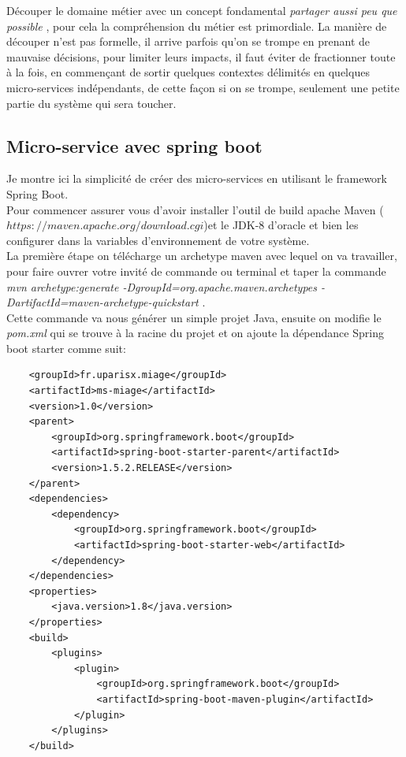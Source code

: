 \documentclass[12pt, a4paper, openany]{report}
\begin{document}
  Découper le domaine métier avec un concept fondamental \textit{partager aussi peu que possible} \cite{refbib6}, pour cela la compréhension du métier est primordiale. La manière de découper n'est pas formelle, il arrive parfois qu'on se trompe en prenant de mauvaise décisions, pour limiter leurs impacts, il faut éviter de fractionner toute à la fois, en commençant de sortir quelques contextes délimités en quelques micro-services indépendants, de cette façon si on se trompe, seulement une petite partie du système qui sera toucher.\\
  
  
\begin{appendices}
 
  \chapter{Micro-service avec spring boot}
  
  Je montre ici la simplicité de créer des micro-services en utilisant le framework Spring Boot.\\
  
  Pour commencer assurer vous d'avoir installer l'outil de build apache Maven ($https://maven.apache.org/download.cgi$)et le JDK-8 d'oracle et bien les configurer dans la variables d’environnement de votre système.\\
  
  La première étape on télécharge un archetype maven avec lequel on va travailler, pour faire ouvrer votre invité de commande ou terminal et taper la commande \textit{mvn archetype:generate -DgroupId=org.apache.maven.archetypes -DartifactId=maven-archetype-quickstart} . \\ 
  
  Cette commande va nous générer un simple projet Java, ensuite on modifie le \textit{pom.xml} qui se trouve à la racine du projet et on ajoute la dépendance Spring boot starter comme suit:
  
\begin{lstlisting}
    <groupId>fr.uparisx.miage</groupId>
    <artifactId>ms-miage</artifactId>
    <version>1.0</version>
    <parent>
        <groupId>org.springframework.boot</groupId>
        <artifactId>spring-boot-starter-parent</artifactId>
        <version>1.5.2.RELEASE</version>
    </parent>
    <dependencies>
        <dependency>
            <groupId>org.springframework.boot</groupId>
            <artifactId>spring-boot-starter-web</artifactId>
        </dependency>
    </dependencies>
    <properties>
        <java.version>1.8</java.version>
    </properties>
    <build>
        <plugins>
            <plugin>
                <groupId>org.springframework.boot</groupId>
                <artifactId>spring-boot-maven-plugin</artifactId>
            </plugin>
        </plugins>
    </build>
\end{lstlisting}
 

\end{appendices}
\end{document}
